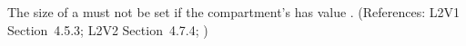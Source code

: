 The size of a \Compartment must not be set if the compartment's
  has value . (References: L2V1
Section~4.5.3; L2V2 Section~4.7.4; )
